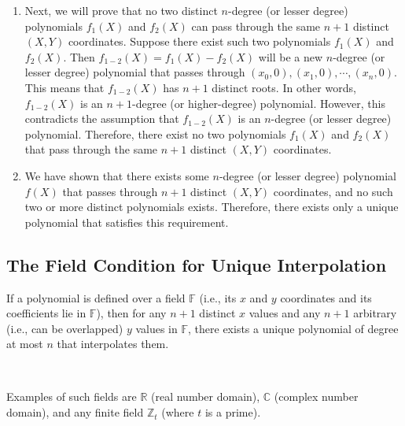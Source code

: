 \begin{myproof}
\begin{enumerate}
\item Next, we will prove that no two distinct $n$-degree (or lesser degree) polynomials $f_1(X)$ and $f_2(X)$ can pass through the same $n+1$ distinct $(X, Y)$ coordinates. Suppose there exist such two polynomials $f_1(X)$ and $f_2(X)$. Then $f_{1-2}(X) = f_1(X) - f_2(X)$ will be a new $n$-degree (or lesser degree) polynomial that passes through $(x_0, 0), (x_1, 0), \cdots, (x_n, 0)$. This means that $f_{1-2}(X)$ has $n+1$ distinct roots. In other words, $f_{1-2}(X)$ is an $n+1$-degree (or higher-degree) polynomial. However, this contradicts the assumption that $f_{1-2}(X)$ is an $n$-degree (or lesser degree) polynomial. Therefore, there exist no two polynomials $f_1(X)$ and $f_2(X)$ that pass through the same $n+1$ distinct $(X, Y)$ coordinates. 

\item We have shown that there exists some $n$-degree (or lesser degree) polynomial $f(X)$ that passes through $n+1$ distinct $(X, Y)$ coordinates, and no such two or more distinct polynomials exists. Therefore, there exists only a unique polynomial that satisfies this requirement. 

\end{enumerate}
\end{myproof}



\subsection{The Field Condition for Unique Interpolation}
\label{subsec:polynomial-interpolation-field-condition}


\begin{tcolorbox}[title={\textbf{\tboxtheorem{\ref*{subsec:polynomial-interpolation-field-condition}} The Field Condition for Unique Interpolation}}]

If a polynomial is defined over a field $\mathbb{F}$
 (i.e., its $x$ and $y$
coordinates and its coefficients lie in $\mathbb{F}$), then for any $n+1$ distinct $x$ values and any $n+1$ arbitrary (i.e., can be overlapped) $y$ values in $\mathbb{F}$, there exists a unique polynomial of degree at most $n$ that interpolates them.

$ $

Examples of such fields are $\mathbb{R}$ (real number domain), $\mathbb{C}$ (complex number domain), and any finite field $\mathbb{Z}_t$ (where $t$ is a prime). 

\end{tcolorbox}


